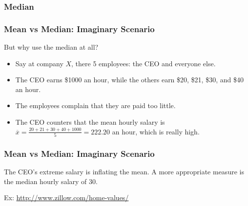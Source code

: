 \documentclass[handout]{beamer}
\newcommand{\blue}[1]{\textcolor{blue2}{#1}}
\begin{document}
\begin{frame}[fragile]
\frametitle{Median}
%
%
%
%

\end{frame}


\begin{frame}
\frametitle{Mean vs Median: Imaginary Scenario}

But why use the median at all?

\begin{itemize}
\item Say at company $X$, there 5 employees:  the CEO and everyone else.  
\pause\item The CEO earns \$1000 an hour, while the others earn \$20, \$21, \$30, and \$40 an hour. 
\pause\item The employees complain that they are paid too little.  
\pause\item The CEO counters that the mean hourly salary is $\overline{x}=\frac{20+21+30+40+1000}{5} = 222.20$ an hour, which is really high.
\end{itemize}

\end{frame}


\begin{frame}
\frametitle{Mean vs Median: Imaginary Scenario}
The CEO's extreme salary is inflating the mean.  A more appropriate measure is the median hourly salary of $30$.

\vspace{0.5cm}

\pause Ex: \blue{\url{http://www.zillow.com/home-values/}}

%
%

\end{frame}
\end{document}
